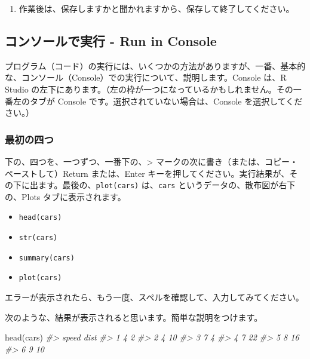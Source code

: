 \documentclass[
]{bxjsbook}
\newenvironment{Shaded}{\begin{snugshade}}{\end{snugshade}}
\newcommand{\CommentTok}[1]{\textcolor[rgb]{0.56,0.35,0.01}{\textit{#1}}}
\newcommand{\FunctionTok}[1]{\textcolor[rgb]{0.00,0.00,0.00}{#1}}
\newcommand{\NormalTok}[1]{#1}
\providecommand{\tightlist}{%
  \setlength{\itemsep}{0pt}\setlength{\parskip}{0pt}}
\theoremstyle{definition}
\theoremstyle{definition}
\theoremstyle{definition}
\theoremstyle{definition}
\theoremstyle{remark}
\begin{document}
\begin{enumerate}
\def\labelenumi{\arabic{enumi}.}
\setcounter{enumi}{4}
\tightlist
\item
  作業後は、保存しますかと聞かれますから、保存して終了してください。
\end{enumerate}

\hypertarget{ux30b3ux30f3ux30bdux30fcux30ebux3067ux5b9fux884c---run-in-console}{%
\subsection{コンソールで実行 - Run in Console}\label{ux30b3ux30f3ux30bdux30fcux30ebux3067ux5b9fux884c---run-in-console}}

プログラム（コード）の実行には、いくつかの方法がありますが、一番、基本的な、コンソール（Console）での実行について、説明します。Console は、R Studio の左下にあります。（左の枠が一つになっているかもしれません。その一番左のタブが Console です。選択されていない場合は、Console を選択してください。）

\hypertarget{ux6700ux521dux306eux56dbux3064}{%
\subsubsection{最初の四つ}\label{ux6700ux521dux306eux56dbux3064}}

下の、四つを、一つずつ、一番下の、\textgreater{} マークの次に書き（または、コピー・ペーストして）Return または、Enter キーを押してください。実行結果が、その下に出ます。最後の、\texttt{plot(cars)} は、\texttt{cars} というデータの、散布図が右下の、Plots タブに表示されます。

\begin{itemize}
\tightlist
\item
  \texttt{head(cars)}
\item
  \texttt{str(cars)}
\item
  \texttt{summary(cars)}
\item
  \texttt{plot(cars)}
\end{itemize}

エラーが表示されたら、もう一度、スペルを確認して、入力してみてください。

次のような、結果が表示されると思います。簡単な説明をつけます。

\begin{Shaded}
\begin{Highlighting}[]
\FunctionTok{head}\NormalTok{(cars)}
\CommentTok{\#\textgreater{}   speed dist}
\CommentTok{\#\textgreater{} 1     4    2}
\CommentTok{\#\textgreater{} 2     4   10}
\CommentTok{\#\textgreater{} 3     7    4}
\CommentTok{\#\textgreater{} 4     7   22}
\CommentTok{\#\textgreater{} 5     8   16}
\CommentTok{\#\textgreater{} 6     9   10}
\end{Highlighting}
\end{Shaded}
\end{document}
